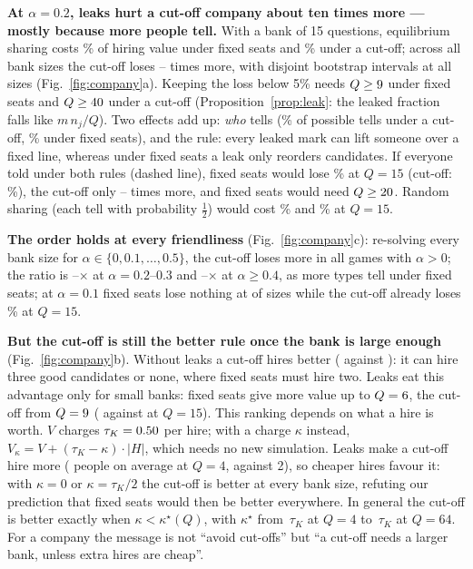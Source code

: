\documentclass[conference]{IEEEtran}
\theoremstyle{plain}
\theoremstyle{definition}\newtheorem{definition}{Definition}
\newcommand{\finding}[1]{\textbf{#1}}
\begin{document}
\finding{At $\alpha=0.2$, leaks hurt a cut-off company about ten times more --- mostly because more people tell.} With a bank of 15 questions, equilibrium sharing costs \LamSeatsQFifteen\% of hiring value under fixed seats and \LamBarQFifteen\% under a cut-off;
across all bank sizes the cut-off loses \LamRatioMin--\LamRatioMax{} times more, with disjoint bootstrap intervals at all \LamOrderTot{} sizes (Fig.~\ref{fig:company}a). Keeping the loss below 5\% needs $Q\ge9$ under fixed seats and $Q\ge40$ under a cut-off
(Proposition~\ref{prop:leak}: the leaked fraction falls like $m\,n_j/Q$). Two effects add up: \emph{who} tells (\XfourShareBar\% of possible tells under a cut-off, \XfourShareSeats\% under fixed seats), and the rule:
every leaked mark can lift someone over a fixed line, whereas under fixed seats a leak only reorders candidates. If everyone told under both rules (dashed line), fixed seats would lose \LamAllSeatsQFifteen\% at $Q=15$ (cut-off: \LamAllBarQFifteen\%),
the cut-off only \LamAllRatioMin--\LamAllRatioMax{} times more, and fixed seats would need $Q\ge20$. Random sharing (each tell with probability $\frac12$) would cost \LamRandomSeatsQFifteen\% and \LamRandomBarQFifteen\% at $Q=15$.

\finding{The order holds at every friendliness} (Fig.~\ref{fig:company}c): re-solving every bank size for $\alpha\in\{0,0.1,\dots,0.5\}$, the cut-off loses more in all \XfourRobBarMore{} games with $\alpha>0$;
the ratio is \XfourRobRatioLowMin--\XfourRobRatioLowMax$\times$ at $\alpha=0.2$--$0.3$ and \XfourRobRatioHighMin--\XfourRobRatioHighMax$\times$ at $\alpha\ge0.4$, as more types tell under fixed seats; at $\alpha=0.1$ fixed seats lose nothing at \XfourRobAlphaOneSeatsZero{} of \XfourRobQs{} sizes while the cut-off already loses \XfourRobBarAOneQFifteen\% at $Q=15$.

\finding{But the cut-off is still the better rule once the bank is large enough} (Fig.~\ref{fig:company}b). Without leaks a cut-off hires better (\VNoLeakBar{} against \VNoLeakSeats): it can hire three good candidates or none,
where fixed seats must hire two. Leaks eat this advantage only for small banks: fixed seats give more value up to $Q=6$, the cut-off from $Q=9$ (\VEqBarQFifteen{} against \VEqSeatsQFifteen{} at $Q=15$).
This ranking depends on what a hire is worth. $V$ charges $\tau_K=0.50$ per hire; with a charge $\kappa$ instead, $V_\kappa=V+(\tau_K-\kappa)\cdot|H|$, which needs no new simulation. Leaks make a cut-off hire more (\XfourRobHiredBarQFour{} people on average at $Q=4$, against 2),
so cheaper hires favour it: with $\kappa=0$ or $\kappa=\tau_K/2$ the cut-off is better at every bank size, refuting our prediction that fixed seats would then be better everywhere. In general the cut-off is better exactly when $\kappa<\kappa^\star(Q)$, with $\kappa^\star$ from
\KappaFlipMin$\,\tau_K$ at $Q=4$ to \KappaFlipMax$\,\tau_K$ at $Q=64$. For a company the message is not ``avoid cut-offs'' but ``a cut-off needs a larger bank, unless extra hires are cheap''.
\end{document}
